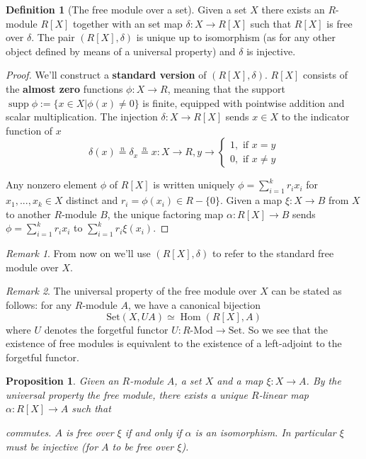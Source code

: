 \documentclass[a4paper,12pt,parskip=half*,chapterprefix=true,numbers=noendperiod]{scrreprt}
\newcommand{\opname}{\operatorname}
\newtheorem{proposition}{Proposition}[section]
\theoremstyle{definition}
\newtheorem{definition}{Definition}[section]
\theoremstyle{remark}
\newtheorem*{remark}{Remark}
\begin{document}
\begin{definition}[The free module over a set]
	Given a set $X$ there exists an $R$-module $R[X]$ together with an set map $\delta:X\to R[X]$ such that $R[X]$ is free over $\delta$. The pair $(R[X],\delta)$ is unique up to isomorphism (as for any other object defined by means of a universal property) and $\delta$ is injective.
\end{definition}
\begin{proof}
We'll construct a \textbf{standard version} of $(R[X],\delta)$. $R[X]$ consists of the \textbf{almost zero} functions $\phi:X\to R$, meaning that the support $\operatorname{supp}\phi:=\{x\in X|\phi(x)\neq 0\}$ is finite, equipped with pointwise addition and scalar multiplication. The injection $\delta:X\to R[X]$ sends $x\in X$ to the indicator function of $x$
\begin{equation*}
	\delta(x)\overset{n}{=}\delta_x\overset{n}{=}x:X\to R,y\to\begin{cases} 1,\text{ if }x=y\\
	0,\text{ if }x\neq y
	\end{cases}
\end{equation*}

Any nonzero element $\phi$ of $R[X]$ is written uniquely $\phi=\sum_{i=1}^kr_ix_i$ for $x_1,...,x_k\in X$ distinct and $r_i=\phi(x_i)\in R-\{0\}$. Given a map $\xi:X\to B$ from $X$ to another $R$-module $B$, the unique factoring map $\alpha:R[X]\to B$ sends $\phi=\sum_{i=1}^kr_ix_i$ to $\sum_{i=1}^kr_i\xi(x_i)$.
\end{proof}

\begin{remark}
	From now on we'll use $(R[X],\delta)$ to refer to the standard free module over $X$.
\end{remark}
\begin{remark}
	The universal property of the free module over $X$ can be stated as follows: for any $R$-module $A$, we have a canonical bijection
	\begin{equation*}
		\text{Set}(X,UA)\simeq\opname{Hom}(R[X],A)
	\end{equation*}
	where $U$ denotes the forgetful functor $U:R\text{-Mod}\to\text{Set}$. So we see that the existence of free modules is equivalent to the existence of a left-adjoint to the forgetful functor.
\end{remark}

\begin{proposition}	
	Given an $R$-module $A$, a set $X$ and a map $\xi:X\to A$. By the universal property the free module, there exists a unique $R$-linear map $\alpha:R[X]\to A$ such that
	\begin{figure}[H]
	\centering
	\end{figure}
	commutes. $A$ is free over $\xi$ if and only if $\alpha$ is an isomorphism. In particular $\xi$ must be injective (for $A$ to be free over $\xi$).
\end{proposition}
\end{document}
